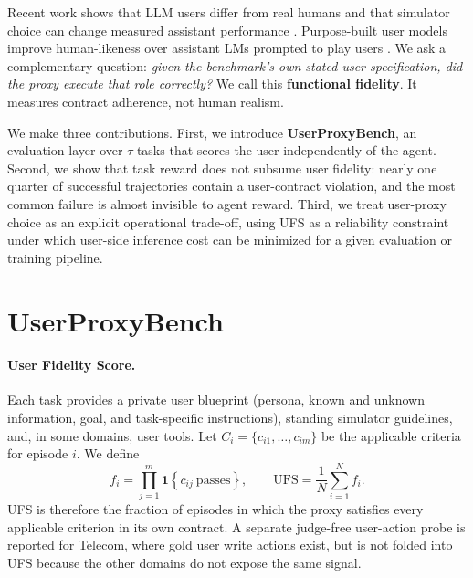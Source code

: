 \documentclass{article}
\newcommand{\ufs}{\mathrm{UFS}}
\begin{document}
Recent work shows that LLM users differ from real humans and that simulator choice can change measured assistant performance \citep{dou2025simulatorarena,seshadri2026lost,zhou2026sim2real}. Purpose-built user models improve human-likeness over assistant LMs prompted to play users \citep{naous2026userlm,wu2026humanlm}. We ask a complementary question: \emph{given the benchmark's own stated user specification, did the proxy execute that role correctly?} We call this \textbf{functional fidelity}. It measures contract adherence, not human realism.

We make three contributions. First, we introduce \textbf{UserProxyBench}, an evaluation layer over $\tau$ tasks that scores the user independently of the agent. Second, we show that task reward does not subsume user fidelity: nearly one quarter of successful trajectories contain a user-contract violation, and the most common failure is almost invisible to agent reward. Third, we treat user-proxy choice as an explicit operational trade-off, using UFS as a reliability constraint under which user-side inference cost can be minimized for a given evaluation or training pipeline.

\section{UserProxyBench}
\label{sec:userproxybench}
\paragraph{User Fidelity Score.}
Each task provides a private user blueprint (persona, known and unknown information, goal, and task-specific instructions), standing simulator guidelines, and, in some domains, user tools. Let $C_i=\{c_{i1},\ldots,c_{im}\}$ be the applicable criteria for episode $i$. We define
\begin{equation}
 f_i=\prod_{j=1}^{m}\mathbf{1}\!\left\{c_{ij}\ \text{passes}\right\}, \qquad
 \ufs=\frac{1}{N}\sum_{i=1}^{N}f_i .
\end{equation}
UFS is therefore the fraction of episodes in which the proxy satisfies every applicable criterion in its own contract. A separate judge-free user-action probe is reported for Telecom, where gold user write actions exist, but is not folded into UFS because the other domains do not expose the same signal.
\end{document}
